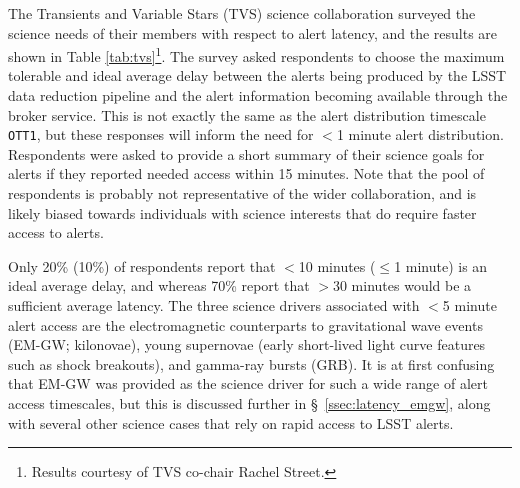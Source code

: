 \documentclass[DM,lsstdraft,authoryear,toc]{lsstdoc}
\begin{document}
The Transients and Variable Stars (TVS) science collaboration surveyed the science needs of their members with respect to alert latency, and the results are shown in Table \ref{tab:tvs}\footnote{Results courtesy of TVS co-chair Rachel Street.}. The survey asked respondents to choose the maximum tolerable and ideal average delay between the alerts being produced by the LSST data reduction pipeline and the alert information becoming available through the broker service. This is not exactly the same as the alert distribution timescale {\tt OTT1}, but these responses will inform the need for $<$1 minute alert distribution.  Respondents were asked to provide a short summary of their science goals for alerts if they reported needed access within 15 minutes. Note that the pool of respondents is probably not representative of the wider collaboration, and is likely biased towards individuals with science interests that do require faster access to alerts. 

Only 20\% (10\%) of respondents report that $<$10 minutes ($\leq$1 minute) is an ideal average delay, and whereas 70\% report that $>$30 minutes would be a sufficient average latency. The three science drivers associated with $<$5 minute alert access are the electromagnetic counterparts to gravitational wave events (EM-GW; kilonovae), young supernovae (early short-lived light curve features such as shock breakouts), and gamma-ray bursts (GRB). It is at first confusing that EM-GW was provided as the science driver for such a wide range of alert access timescales, but this is discussed further in \S~\ref{ssec:latency_emgw}, along with several other science cases that rely on rapid access to LSST alerts.
\end{document}
